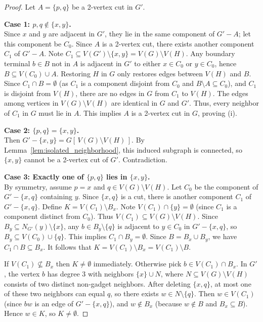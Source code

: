 \documentclass[12pt]{article}
\begin{document}
\begin{proof}
Let $A = \{p, q\}$ be a 2-vertex cut in $G'$.

\medskip
\noindent\textbf{Case 1: $p, q \notin \{x, y\}$.} \\
Since $x$ and $y$ are adjacent in $G'$, they lie in the same component of $G' - A$; let this component be $C_0$. Since $A$ is a 2-vertex cut, there exists another component $C_1$ of $G' - A$. 
Note $C_1 \subseteq V(G') \setminus \{x, y\} = V(G) \setminus V(H)$.
Any boundary terminal $b \in B$ not in $A$ is adjacent in $G'$ to either $x \in C_0$ or $y \in C_0$, hence $B \subseteq V(C_0) \cup A$.
Restoring $H$ in $G$ only restores edges between $V(H)$ and $B$. Since $C_1 \cap B = \emptyset$ (as $C_1$ is a component disjoint from $C_0$ and $B \setminus A \subseteq C_0$), and $C_1$ is disjoint from $V(H)$, there are no edges in $G$ from $C_1$ to $V(H)$. The edges among vertices in $V(G) \setminus V(H)$ are identical in $G$ and $G'$. Thus, every neighbor of $C_1$ in $G$ must lie in $A$. This implies $A$ is a 2-vertex cut in $G$, proving (i).

\medskip
\noindent\textbf{Case 2: $\{p, q\} = \{x, y\}$.} \\
Then $G' - \{x, y\} = G[\,V(G) \setminus V(H)\,]$. By Lemma~\ref{lem:isolated_neighborhood}, this induced subgraph is connected, so $\{x, y\}$ cannot be a 2-vertex cut of $G'$. Contradiction.

\medskip
\noindent\textbf{Case 3: Exactly one of $\{p, q\}$ lies in $\{x, y\}$.} \\
By symmetry, assume $p = x$ and $q \in V(G) \setminus V(H)$. 
Let $C_0$ be the component of $G' - \{x, q\}$ containing $y$. Since $\{x, q\}$ is a cut, there is another component $C_1$ of $G' - \{x, q\}$.
Define $K = V(C_1) \setminus B_x$. 
Note $V(C_1) \cap \{y\} = \emptyset$ (since $C_1$ is a component distinct from $C_0$). Thus $V(C_1) \subseteq V(G) \setminus V(H)$.
Since $B_y \subseteq N_{G'}(y) \setminus \{x\}$, any $b \in B_y \setminus \{q\}$ is adjacent to $y \in C_0$ in $G' - \{x, q\}$, so $B_y \subseteq V(C_0) \cup \{q\}$.
This implies $C_1 \cap B_y = \emptyset$. Since $B = B_x \cup B_y$, we have $C_1 \cap B \subseteq B_x$.
It follows that $K = V(C_1) \setminus B_x = V(C_1) \setminus B$.

If $V(C_1)\nsubseteq B_x$ then $K\neq\emptyset$ immediately. Otherwise pick $b\in V(C_1)\cap B_x$.
In $G'$, the vertex $b$ has degree $3$ with neighbors $\{x\}\cup N$, where $N\subseteq V(G)\setminus V(H)$ consists of two distinct non-gadget neighbors.
After deleting $\{x,q\}$, at most one of these two neighbors can equal $q$, so there exists $w\in N\setminus\{q\}$.
Then $w\in V(C_1)$ (since $bw$ is an edge of $G'-\{x,q\}$), and $w\notin B_x$ (because $w\notin B$ and $B_x\subseteq B$).
Hence $w\in K$, so $K\neq\emptyset$.


\end{proof}
\end{document}
